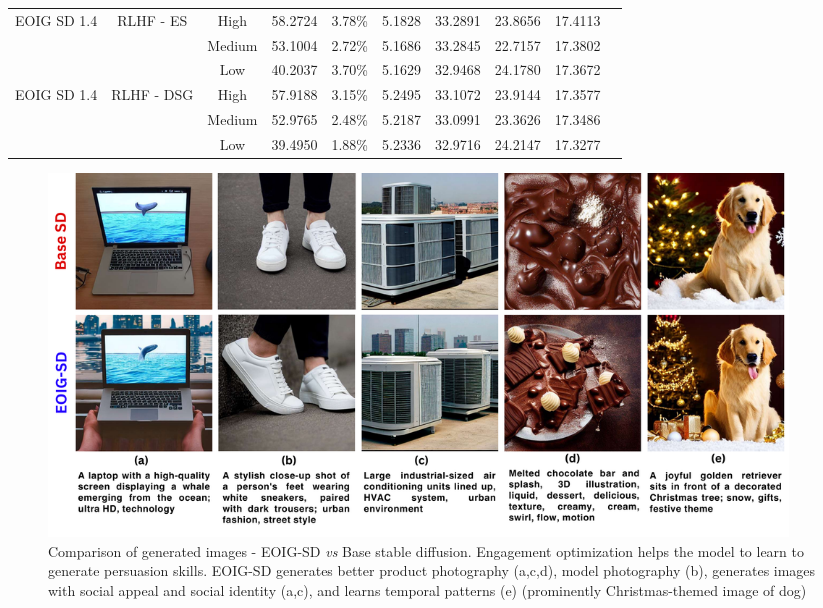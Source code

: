 \begin{table}[!b]
{\begin{tabular}{lccccccccc}
             \multirow{3}{*}{EOIG SD 1.4} &\multirow{3}{*}{RLHF - ES} &High &58.2724 &3.78\% &5.1828 &33.2891 &23.8656 &17.4113 \\
             & &Medium &53.1004 &2.72\% &5.1686 &33.2845 &22.7157 &17.3802 \\
             & &Low &40.2037 &3.70\% &5.1629 &32.9468 &24.1780 &17.3672 \\\midrule
             \multirow{3}{*}{EOIG SD 1.4} &\multirow{3}{*}{RLHF - DSG} &High &57.9188 &3.15\% &5.2495 &33.1072 &23.9144 &17.3577 \\
             & &Medium &52.9765 &2.48\% &5.2187 &33.0991 &23.3626 &17.3486 \\
             & &Low &39.4950 &1.88\% &5.2336 &32.9716 &24.2147 &17.3277 \\
             \bottomrule
             \end{tabular}}
\end{table}
 



\begin{figure}[!t]
  \centering
  \includegraphics[width=0.95\textwidth]{images/marketing-images-comparison_compressed.pdf}
  \caption{\small{Comparison of generated images - EOIG-SD \textit{vs} Base stable diffusion. Engagement optimization helps the model to learn to generate persuasion skills. EOIG-SD generates better product photography (a,c,d), model photography (b), generates images with social appeal and social identity (a,c), and learns temporal patterns (e) (prominently Christmas-themed image of dog)}
  \label{img:comparison-marketing-image}
  }
\end{figure}

